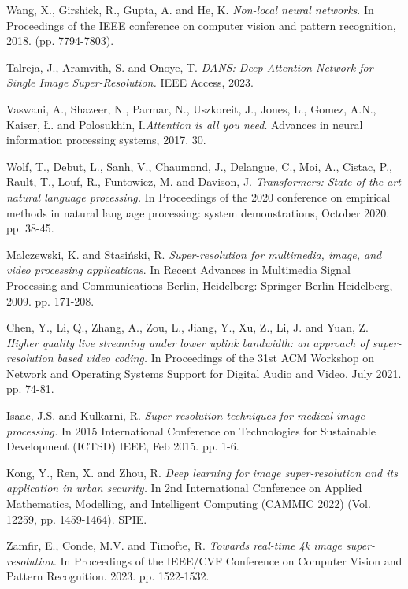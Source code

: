 \documentclass[twocolumn]{svjour3}          %
\begin{document}
\begin{thebibliography}{00}
 Wang, X., Girshick, R., Gupta, A. and He, K. \textit{Non-local neural networks}. In Proceedings of the IEEE conference on computer vision and pattern recognition, 2018. (pp. 7794-7803).

 Talreja, J., Aramvith, S. and Onoye, T. \textit{DANS: Deep Attention Network for Single Image Super-Resolution.} IEEE Access, 2023.

 Vaswani, A., Shazeer, N., Parmar, N., Uszkoreit, J., Jones, L., Gomez, A.N., Kaiser, Ł. and Polosukhin, I.\textit{Attention is all you need}. Advances in neural information processing systems, 2017. 30.

 Wolf, T., Debut, L., Sanh, V., Chaumond, J., Delangue, C., Moi, A., Cistac, P., Rault, T., Louf, R., Funtowicz, M. and Davison, J. \textit{Transformers: State-of-the-art natural language processing.} In Proceedings of the 2020 conference on empirical methods in natural language processing: system demonstrations, October 2020. pp. 38-45.

 Malczewski, K. and Stasiński, R. \textit{Super-resolution for multimedia, image, and video processing applications}. In Recent Advances in Multimedia Signal Processing and Communications Berlin, Heidelberg: Springer Berlin Heidelberg, 2009. pp. 171-208.

 Chen, Y., Li, Q., Zhang, A., Zou, L., Jiang, Y., Xu, Z., Li, J. and Yuan, Z. \textit{Higher quality live streaming under lower uplink bandwidth: an approach of super-resolution based video coding.} In Proceedings of the 31st ACM Workshop on Network and Operating Systems Support for Digital Audio and Video, July 2021. pp. 74-81.

 Isaac, J.S. and Kulkarni, R. \textit{Super-resolution techniques for medical image processing.} In 2015 International Conference on Technologies for Sustainable Development (ICTSD) IEEE, Feb 2015. pp. 1-6.

 Kong, Y., Ren, X. and Zhou, R. \textit{Deep learning for image super-resolution and its application in urban security.} In 2nd International Conference on Applied Mathematics, Modelling, and Intelligent Computing (CAMMIC 2022) (Vol. 12259, pp. 1459-1464). SPIE.

 Zamfir, E., Conde, M.V. and Timofte, R. \textit{Towards real-time 4k image super-resolution.} In Proceedings of the IEEE/CVF Conference on Computer Vision and Pattern Recognition. 2023. pp. 1522-1532.


\end{thebibliography}
\end{document}

